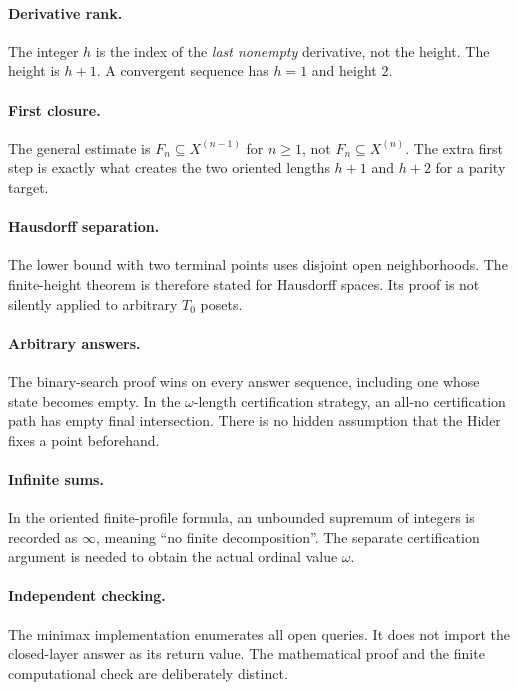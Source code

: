 \documentclass[11pt,letterpaper]{article}
\numberwithin{equation}{section}
\theoremstyle{definition}
\theoremstyle{remark}
\begin{document}
\paragraph{Derivative rank.}
The integer $h$ is the index of the \emph{last nonempty} derivative, not the
height. The height is $h+1$. A convergent sequence has $h=1$ and height $2$.

\paragraph{First closure.}
The general estimate is $F_n\subseteq X^{(n-1)}$ for $n\geq1$, not
$F_n\subseteq X^{(n)}$. The extra first step is exactly what creates the two
oriented lengths $h+1$ and $h+2$ for a parity target.

\paragraph{Hausdorff separation.}
The lower bound with two terminal points uses disjoint open neighborhoods.
The finite-height theorem is therefore stated for Hausdorff spaces. Its proof
is not silently applied to arbitrary $T_0$ posets.

\paragraph{Arbitrary answers.}
The binary-search proof wins on every answer sequence, including one whose
state becomes empty. In the $\omega$-length certification strategy, an
all-no certification path has empty final intersection. There is no hidden
assumption that the Hider fixes a point beforehand.

\paragraph{Infinite sums.}
In the oriented finite-profile formula, an unbounded supremum of integers is
recorded as $\infty$, meaning ``no finite decomposition''. The separate
certification argument is needed to obtain the actual ordinal value $\omega$.

\paragraph{Independent checking.}
The minimax implementation enumerates all open queries. It does not import the
closed-layer answer as its return value. The mathematical proof and the
finite computational check are deliberately distinct.
\end{document}
